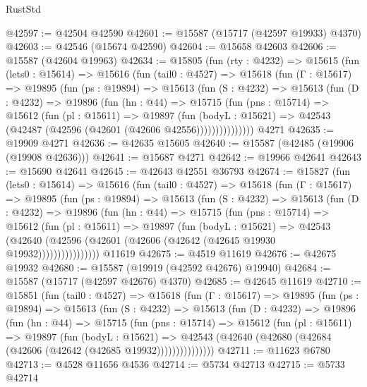 \begin{lexlean}{RustStd}
\begin{coremodule}
@42597 := @42504 @42590
@42601 := @15587 (@15717 (@42597 @19933) @4370)
@42603 := @42546 (@15674 @42590)
@42604 := @15658 @42603
@42606 := @15587 (@42604 @19963)
@42634 := @15805
    (fun (rty : @4232) =>
    @15615
      (fun (lets0 : @15614) =>
      @15616
        (fun (tail0 : @4527) =>
        @15618
          (fun (Γ : @15617) =>
          @19895
            (fun (ps : @19894) =>
            @15613
              (fun (S : @4232) =>
              @15613
                (fun (D : @4232) =>
                @19896
                  (fun (hn : @44) =>
                  @15715
                    (fun (pns : @15714) =>
                    @15612
                      (fun (pl : @15611) =>
                      @19897
                        (fun (bodyL : @15621) =>
                        @42543 (@42487 (@42596 (@42601 (@42606 @42556)))))))))))))))
    @4271
@42635 := @19909 @4271
@42636 := @42635 @15605
@42640 := @15587 (@42485 (@19906 (@19908 @42636)))
@42641 := @15687 @4271
@42642 := @19966 @42641
@42643 := @15690 @42641
@42645 := @42643 @42551 @36793
@42674 := @15827
    (fun (lets0 : @15614) =>
    @15616
      (fun (tail0 : @4527) =>
      @15618
        (fun (Γ : @15617) =>
        @19895
          (fun (ps : @19894) =>
          @15613
            (fun (S : @4232) =>
            @15613
              (fun (D : @4232) =>
              @19896
                (fun (hn : @44) =>
                @15715
                  (fun (pns : @15714) =>
                  @15612
                    (fun (pl : @15611) =>
                    @19897
                      (fun (bodyL : @15621) =>
                      @42543
                        (@42640
                          (@42596 (@42601 (@42606 (@42642 (@42645 @19930 @19932))))))))))))))))
    @11619
@42675 := @4519 @11619
@42676 := @42675 @19932
@42680 := @15587 (@19919 (@42592 @42676) @19940)
@42684 := @15587 (@15717 (@42597 @42676) @4370)
@42685 := @42645 @11619
@42710 := @15851
    (fun (tail0 : @4527) =>
    @15618
      (fun (Γ : @15617) =>
      @19895
        (fun (ps : @19894) =>
        @15613
          (fun (S : @4232) =>
          @15613
            (fun (D : @4232) =>
            @19896
              (fun (hn : @44) =>
              @15715
                (fun (pns : @15714) =>
                @15612
                  (fun (pl : @15611) =>
                  @19897
                    (fun (bodyL : @15621) =>
                    @42543 (@42640 (@42680 (@42684 (@42606 (@42642 (@42685 @19932)))))))))))))))
@42711 := @11623 @6780
@42713 := @4528 @11656 @4536
@42714 := @5734 @42713
@42715 := @5733 @42714

\end{coremodule}
\end{lexlean}
